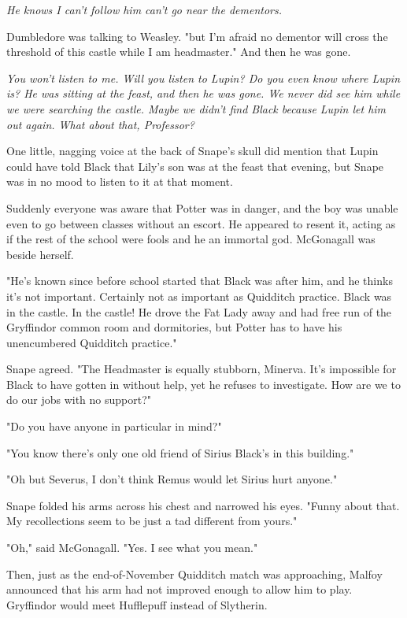 \emph{He knows I can't follow him{\el} can't go near the dementors.}

Dumbledore was talking to Weasley. "{\el}but I'm afraid no dementor will cross the threshold of this castle while I am headmaster." And then he was gone.

\emph{You won't listen to me. Will you listen to Lupin? Do you even know where Lupin is? He was sitting at the feast, and then he was gone. We never did see him while we were searching the castle. Maybe we didn't find Black because Lupin let him out again. What about that, Professor?}

One little, nagging voice at the back of Snape's skull did mention that Lupin could have told Black that Lily's son was at the feast that evening, but Snape was in no mood to listen to it at that moment.

Suddenly everyone was aware that Potter was in danger, and the boy was unable even to go between classes without an escort. He appeared to resent it, acting as if the rest of the school were fools and he an immortal god. McGonagall was beside herself.

"He's known since before school started that Black was after him, and he thinks it's not important. Certainly not as important as Quidditch practice. Black was in the castle. In the castle! He drove the Fat Lady away and had free run of the Gryffindor common room and dormitories, but Potter has to have his unencumbered Quidditch practice."

Snape agreed. "The Headmaster is equally stubborn, Minerva. It's impossible for Black to have gotten in without help, yet he refuses to investigate. How are we to do our jobs with no support?"

"Do you have anyone in particular in mind?"

"You know there's only one old friend of Sirius Black's in this building."

"Oh but Severus, I don't think Remus would let Sirius hurt anyone."

Snape folded his arms across his chest and narrowed his eyes. "Funny about that. My recollections seem to be just a tad different from yours."

"Oh," said McGonagall. "Yes. I see what you mean."

Then, just as the end-of-November Quidditch match was approaching, Malfoy announced that his arm had not improved enough to allow him to play. Gryffindor would meet Hufflepuff instead of Slytherin.

